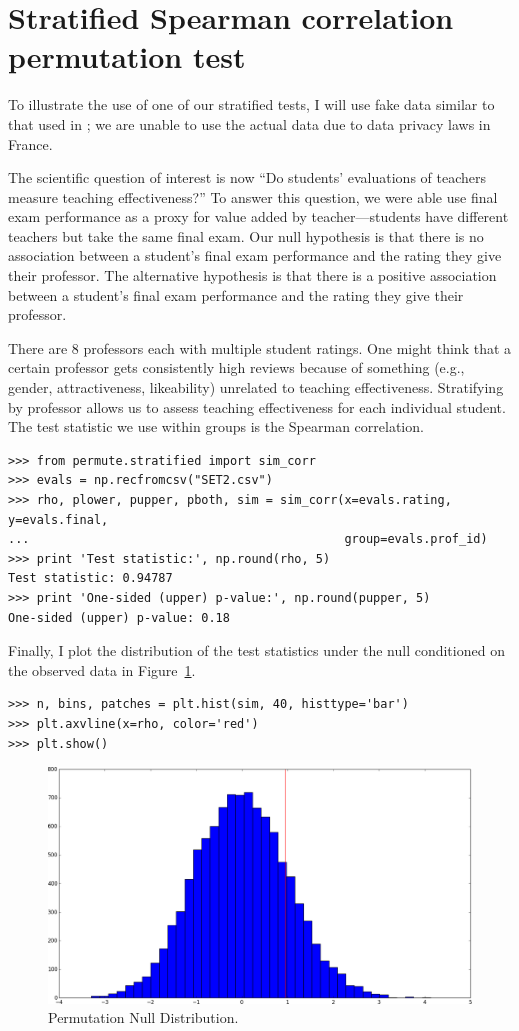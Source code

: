 \section*{Stratified Spearman correlation permutation test}

To illustrate the use of one of our stratified tests, I will use fake
data similar to that used in \cite{boring2015}; we are unable to use
the actual data due to data privacy laws in France.

The scientific question of interest is now ``Do students' evaluations of
teachers measure teaching effectiveness?''  To answer this question, we were
able use final exam performance as a proxy for value added by
teacher---students have different teachers but take the same final exam.
Our null hypothesis is that there is no association between a student's final
exam performance and the rating they give their professor.  The alternative
hypothesis is that there is a positive association between a student's final
exam performance and the rating they give their professor.

There are 8 professors each with multiple student ratings.  One might think
that a certain professor gets consistently high reviews because of something (e.g.,
gender, attractiveness, likeability) unrelated to teaching effectiveness.
Stratifying by professor allows us to assess teaching effectiveness for each
individual student.  The test statistic we use within groups is the Spearman
correlation.

\begin{verbatim}
>>> from permute.stratified import sim_corr
>>> evals = np.recfromcsv("SET2.csv")
>>> rho, plower, pupper, pboth, sim = sim_corr(x=evals.rating, y=evals.final,
...                                            group=evals.prof_id)
>>> print 'Test statistic:', np.round(rho, 5)
Test statistic: 0.94787
>>> print 'One-sided (upper) p-value:', np.round(pupper, 5)
One-sided (upper) p-value: 0.18
\end{verbatim}

Finally, I plot the distribution of the test statistics under the null
conditioned on the observed data in Figure~\ref{fig:figure2}.

\begin{verbatim}
>>> n, bins, patches = plt.hist(sim, 40, histtype='bar')
>>> plt.axvline(x=rho, color='red')
>>> plt.show()
\end{verbatim}

\begin{figure}
  \begin{centering}
    \includegraphics[width=.8\textwidth]{fig/figure_2.png}\par
  \end{centering}

  \caption{\label{fig:figure2}Permutation Null Distribution.}

\end{figure}

